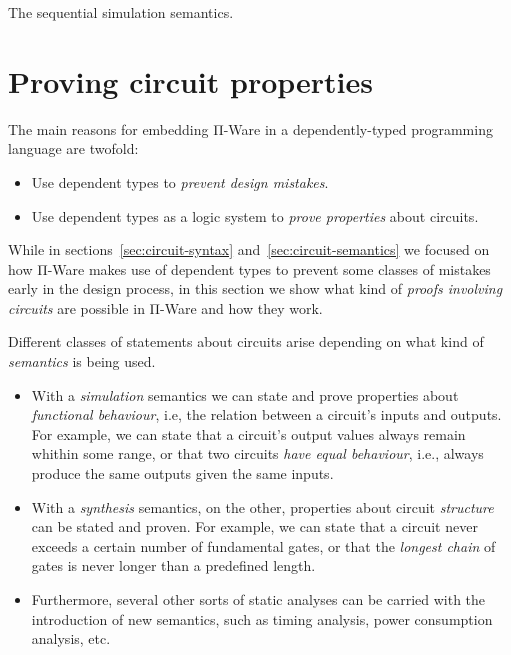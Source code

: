             \begin{listing}[h]
                \caption{The sequential simulation semantics.\label{lst:eval-seq-core}}
            \end{listing}


    \section{Proving circuit properties}
    \label{sec:proving-circuit-properties}

        The main reasons for embedding Π-Ware in a dependently-typed programming language are twofold:

        \begin{itemize}
            \item Use dependent types to \emph{prevent design mistakes}.
            \item Use dependent types as a logic system to \emph{prove properties} about circuits.
        \end{itemize}

        While in sections~\ref{sec:circuit-syntax} and~\ref{sec:circuit-semantics} we focused on
        how Π-Ware makes use of dependent types to prevent some classes of mistakes early in the design process,
        in this section we show what kind of \emph{proofs involving circuits} are possible in Π-Ware
        and how they work.

        Different classes of statements about circuits arise depending on what kind of
        \emph{semantics} is being used.

        \begin{itemize}
            \item With a \emph{simulation} semantics we can state and prove properties about
                \emph{functional behaviour}, i.e, the relation between a circuit's inputs and outputs.
                For example, we can state that a circuit's output values always remain whithin some range,
                or that two circuits \emph{have equal behaviour}, i.e., always produce the same outputs
                given the same inputs.
            \item With a \emph{synthesis} semantics, on the other, properties about circuit \emph{structure}
                can be stated and proven. For example, we can state that a circuit never
                exceeds a certain number of fundamental gates,
                or that the \emph{longest chain} of gates is never longer than a predefined length.
            \item Furthermore, several other sorts of static analyses can be carried with the
                introduction of new semantics, such as timing analysis, power consumption analysis, etc.
        \end{itemize}


